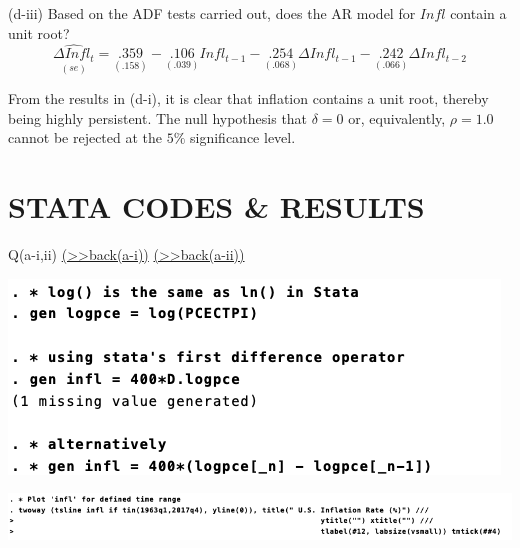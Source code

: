 \documentclass[
  10pt,
  ignorenonframetext,
]{beamer}
\begin{document}
\begin{frame}{(d-iii) Based on the ADF tests carried out, does the AR
model for \(Infl\) contain a unit root?}
\protect\hypertarget{d-iii-based-on-the-adf-tests-carried-out-does-the-ar-model-for-infl-contain-a-unit-root}{}
\[
\underset{(se)}{\widehat{\Delta Infl_t}} = \underset{(.158)}{.359} -\underset{(.039)}{.106} Infl_{t-1} -\underset{(.068)}{.254} \Delta Infl_{t-1} -\underset{(.066)}{.242}\Delta Infl_{t-2} 
\]

From the results in (d-i), it is clear that inflation contains a unit
root, thereby being highly persistent. The null hypothesis that
\(\delta=0\) or, equivalently, \(\rho = 1.0\) cannot be rejected at the
\(5\%\) significance level.
\end{frame}

\hypertarget{stata-codes-results}{%
\section{STATA CODES \& RESULTS}\label{stata-codes-results}}

\begin{frame}{Q(a-i,ii)
\footnotesize \protect\hyperlink{Plot-infl-A1}{(\textgreater\textgreater back(a-i))}
\protect\hyperlink{Plot-infl-A2}{(\textgreater\textgreater back(a-ii))}
\normalsize }
\protect\hypertarget{Plot-infl}{}
\begin{flushleft}\includegraphics[width=0.65\linewidth]{pictures/(a-i)infl} \end{flushleft}

\vspace{3mm}

\begin{flushleft}\includegraphics[width=1\linewidth]{pictures/(a-ii)Plot-infl} \end{flushleft}
\end{frame}
\end{document}
